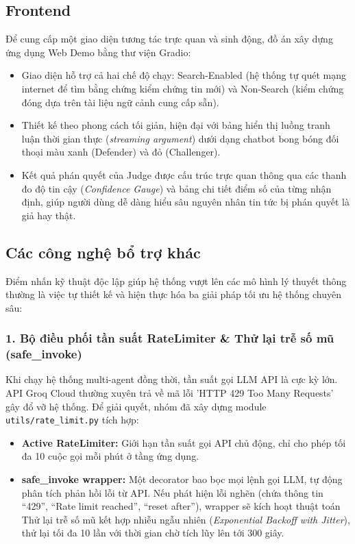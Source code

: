 \documentclass[12pt,a4paper]{report}
\begin{document}
\subsection{Frontend}
Để cung cấp một giao diện tương tác trực quan và sinh động, đồ án xây dựng ứng dụng Web Demo bằng thư viện Gradio:
\begin{itemize}
    \item Giao diện hỗ trợ cả hai chế độ chạy: Search-Enabled (hệ thống tự quét mạng internet để tìm bằng chứng kiểm chứng tin mới) và Non-Search (kiểm chứng đóng dựa trên tài liệu ngữ cảnh cung cấp sẵn).
    \item Thiết kế theo phong cách tối giản, hiện đại với bảng hiển thị luồng tranh luận thời gian thực (\textit{streaming argument}) dưới dạng chatbot bong bóng đối thoại màu xanh (Defender) và đỏ (Challenger).
    \item Kết quả phán quyết của Judge được cấu trúc trực quan thông qua các thanh đo độ tin cậy (\textit{Confidence Gauge}) và bảng chi tiết điểm số của từng nhận định, giúp người dùng dễ dàng hiểu sâu nguyên nhân tin tức bị phán quyết là giả hay thật.
\end{itemize}

\subsection{Các công nghệ bổ trợ khác}
Điểm nhấn kỹ thuật độc lập giúp hệ thống vượt lên các mô hình lý thuyết thông thường là việc tự thiết kế và hiện thực hóa ba giải pháp tối ưu hệ thống chuyên sâu:

\subsubsection{1. Bộ điều phối tần suất RateLimiter \& Thử lại trễ số mũ (safe\_invoke)}
Khi chạy hệ thống multi-agent đồng thời, tần suất gọi LLM API là cực kỳ lớn. API Groq Cloud thường xuyên trả về mã lỗi 'HTTP 429 Too Many Requests' gây đổ vỡ hệ thống. Để giải quyết, nhóm đã xây dựng module \texttt{utils/rate\_limit.py} tích hợp:
\begin{itemize}
    \item \textbf{Active RateLimiter:} Giới hạn tần suất gọi API chủ động, chỉ cho phép tối đa 10 cuộc gọi mỗi phút ở tầng ứng dụng.
    \item \textbf{safe\_invoke wrapper:} Một decorator bao bọc mọi lệnh gọi LLM, tự động phân tích phản hồi lỗi từ API. Nếu phát hiện lỗi nghẽn (chứa thông tin ``429'', ``Rate limit reached'', ``reset after''), wrapper sẽ kích hoạt thuật toán Thử lại trễ số mũ kết hợp nhiễu ngẫu nhiên (\textit{Exponential Backoff with Jitter}), thử lại tối đa 10 lần với thời gian chờ tích lũy lên tới 300 giây.
\end{itemize}
\end{document}
